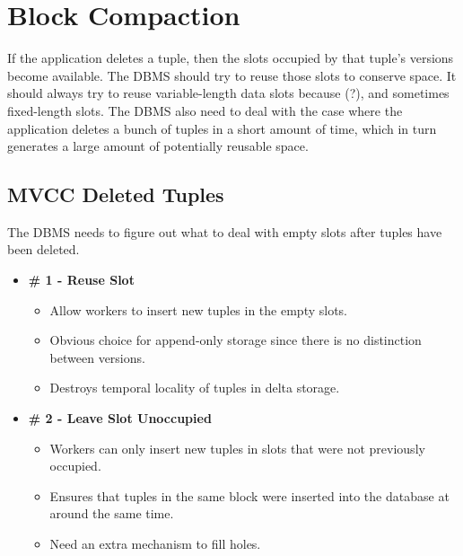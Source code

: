 \documentclass[11pt]{article}
\begin{document}
\section{Block Compaction}
If the application deletes a tuple, then the slots occupied by that tuple's versions become 
available. The DBMS should try to reuse those slots to conserve space. It should always try to 
reuse variable-length data slots because (?), and sometimes fixed-length slots. The DBMS also need 
to deal with the case where the application deletes a bunch of tuples in a short amount of time, 
which in turn generates a large amount of potentially reusable space.

\subsection*{MVCC Deleted Tuples}
The DBMS needs to figure out what to deal with empty slots after tuples have been deleted.
\begin{itemize}
    \item \textbf{\# 1 - Reuse Slot}
\begin{itemize}
    \item Allow workers to insert new tuples in the empty slots.
    \item Obvious choice for append-only storage since there is no distinction between versions.
    \item Destroys temporal locality of tuples in delta storage.
\end{itemize}
    \item \textbf{\# 2 - Leave Slot Unoccupied}
    \begin{itemize}
        \item Workers can only insert new tuples in slots that were not previously occupied.
        \item Ensures that tuples in the same block were inserted into the database at around the 
same time.
        \item Need an extra mechanism to fill holes.
    \end{itemize}
\end{itemize}

\end{document}
